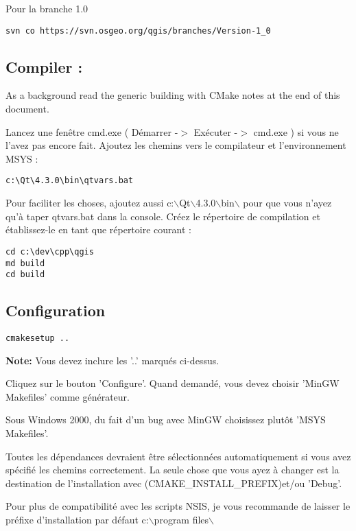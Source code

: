 Pour la branche 1.0

\begin{verbatim}
svn co https://svn.osgeo.org/qgis/branches/Version-1_0
\end{verbatim}

\subsection{Compiler :}
As a background read the generic building with CMake notes at the end of 
this document.

Lancez une fenêtre cmd.exe ( Démarrer -$>$ Exécuter -$>$ cmd.exe ) si vous ne l'avez pas encore fait. Ajoutez les chemins vers le compilateur et l'environnement MSYS :

\begin{verbatim}
c:\Qt\4.3.0\bin\qtvars.bat 
\end{verbatim}

Pour faciliter les choses, ajoutez aussi c:$\backslash$Qt$\backslash$4.3.0$\backslash$bin$\backslash$ pour que vous n'ayez qu'à taper qtvars.bat dans la console. Créez le répertoire de compilation et établissez-le en tant que répertoire courant :

\begin{verbatim}
cd c:\dev\cpp\qgis 
md build 
cd build 
\end{verbatim}

\subsection{Configuration}
\begin{verbatim}
cmakesetup ..  
\end{verbatim}

\textbf{Note:} Vous devez inclure les '..' marqués ci-dessus.

Cliquez sur le bouton 'Configure'.  Quand demandé, vous devez choisir 'MinGW Makefiles' comme générateur.

Sous Windows 2000, du fait d'un bug avec MinGW choisissez plutôt 'MSYS Makefiles'.

Toutes les dépendances devraient être sélectionnées automatiquement si vous avez spécifié les chemins correctement. La seule chose que vous ayez à changer est la destination de l'installation avec (CMAKE\_INSTALL\_PREFIX)et/ou 'Debug'.

Pour plus de compatibilité avec les scripts NSIS, je vous recommande de laisser le préfixe d'installation par défaut  c:$\backslash$program files$\backslash$

